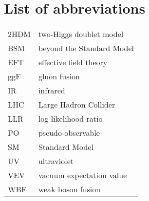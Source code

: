 
\chapter*{List of abbreviations}


\begin{tabularx}{\textwidth}{p{1.5cm} L} 
  2HDM & two-Higgs doublet model \\
  BSM & beyond the Standard Model \\
  EFT & effective field theory \\
  ggF & gluon fusion \\
  IR & infrared \\
  LHC & Large Hadron Collider \\
  LLR & log likelihood ratio \\
  PO & pseudo-observable \\
  SM & Standard Model \\
  UV & ultraviolet \\
  VEV & vacuum expectation value \\
  WBF & weak boson fusion \\
\end{tabularx}